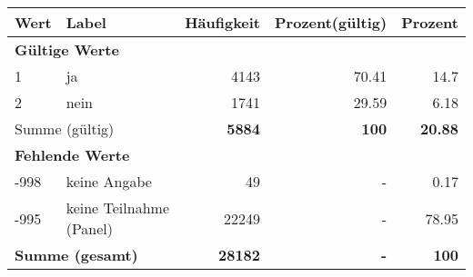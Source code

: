      \begin{longtable}{lXrrr}
     \toprule
     \textbf{Wert} & \textbf{Label} & \textbf{Häufigkeit} & \textbf{Prozent(gültig)} & \textbf{Prozent} \\
     \endhead
     \midrule
     \multicolumn{5}{l}{\textbf{Gültige Werte}}\\

     1 &
     \multicolumn{1}{X}{ ja   } &


       \num{4143} &
       \num[round-mode=places,round-precision=2]{70,41} &
         \num[round-mode=places,round-precision=2]{14,7} \\

     2 &
     \multicolumn{1}{X}{ nein   } &


       \num{1741} &
       \num[round-mode=places,round-precision=2]{29,59} &
         \num[round-mode=places,round-precision=2]{6,18} \\
     \midrule
     \multicolumn{2}{l}{Summe (gültig)} &
       \textbf{\num{5884}} &
     \textbf{100} &
       \textbf{\num[round-mode=places,round-precision=2]{20,88}} \\
     \multicolumn{5}{l}{\textbf{Fehlende Werte}}\\
       -998 &
       keine Angabe &
         \num{49} &
        - &
         \num[round-mode=places,round-precision=2]{0,17} \\
       -995 &
       keine Teilnahme (Panel) &
         \num{22249} &
        - &
         \num[round-mode=places,round-precision=2]{78,95} \\
     \midrule
     \multicolumn{2}{l}{\textbf{Summe (gesamt)}} &
          \textbf{\num{28182}} &
        \textbf{-} &
        \textbf{100} \\
     \bottomrule
     \end{longtable}
     
